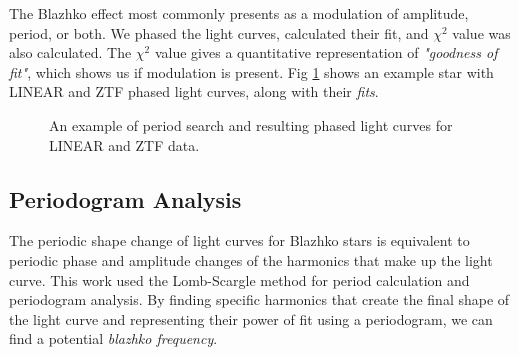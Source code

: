 The Blazhko effect most commonly presents as a modulation of amplitude, period, or both. 
We phased the light curves, calculated their fit, and $\chi^2$ value was also calculated. The $\chi^2$ value gives a quantitative representation of \textit{"goodness of fit"}, which shows us if modulation is present. Fig \ref{fig:lc_pair} shows an example star with LINEAR and ZTF phased light curves, along with their {\it fits}. 



\begin{figure}[ht]
  \centering
       \caption{An example of period search and resulting phased light curves for LINEAR and ZTF data.}
       \label{fig:lc_pair}
  \end{figure}



\subsection{Periodogram Analysis} 
 

The periodic shape change of light curves for Blazhko stars is equivalent to periodic phase and amplitude changes of the
harmonics that make up the light curve. This work used the Lomb-Scargle method for period calculation and periodogram analysis. By finding specific harmonics that create the final shape of the light curve and representing their power of fit using a periodogram, we can find a potential {\it blazhko frequency}.

